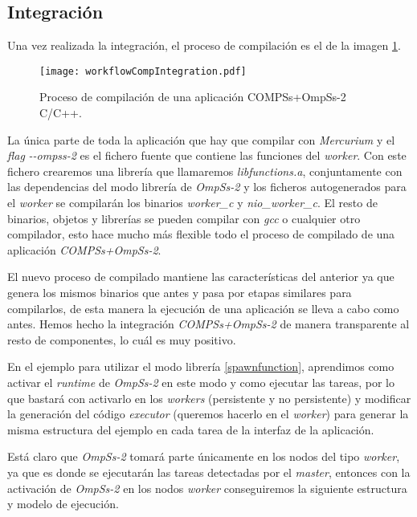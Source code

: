 \subsection{Integración}

Una vez realizada la integración, el proceso de compilación es el de la imagen \ref{fig:workflowcompintegration}.

\begin{figure}[H]
	\centering 
	\caption{Proceso de compilación de una aplicación COMPSs+OmpSs-2 C/C++.}
	\texttt{[image: workflowCompIntegration.pdf]}
	\label{fig:workflowcompintegration}
\end{figure}

\par\bigskip

La única parte de toda la aplicación que hay que compilar con \textit{Mercurium} y el \textit{flag} \textit{-{}-ompss-2} es el fichero fuente que contiene las funciones del \textit{worker}. Con este fichero crearemos una librería que llamaremos \textit{libfunctions.a}, conjuntamente con las dependencias del modo librería de \textit{OmpSs-2} y los ficheros autogenerados para el \textit{worker} se compilarán los binarios \textit{worker\_c} y \textit{nio\_worker\_c}. El resto de binarios, objetos y librerías se pueden compilar con \textit{gcc} o cualquier otro compilador, esto hace mucho más flexible todo el proceso de compilado de una aplicación \textit{COMPSs+OmpSs-2}.
\par\bigskip
El nuevo proceso de compilado mantiene las características del anterior ya que genera los mismos binarios que antes y pasa por etapas similares para compilarlos, de esta manera la ejecución de una aplicación se lleva a cabo como antes. Hemos hecho la integración \textit{COMPSs+OmpSs-2} de manera transparente al resto de componentes, lo cuál es muy positivo.
\par\bigskip 

En el ejemplo para utilizar el modo librería \ref{spawnfunction}, aprendimos como activar el \textit{runtime} de \textit{OmpSs-2} en este modo y como ejecutar las tareas, por lo que bastará con activarlo en los \textit{workers} (persistente y no persistente) y modificar la generación del código \textit{executor} (queremos hacerlo en el \textit{worker}) para generar la misma estructura del ejemplo en cada tarea de la interfaz de la aplicación.
\par\medskip
Está claro que \textit{OmpSs-2} tomará parte únicamente en los nodos del tipo \textit{worker}, ya que es donde se ejecutarán las tareas detectadas por el \textit{master}, entonces con la activación de \textit{OmpSs-2} en los nodos \textit{worker} conseguiremos la siguiente estructura y modelo de ejecución.


